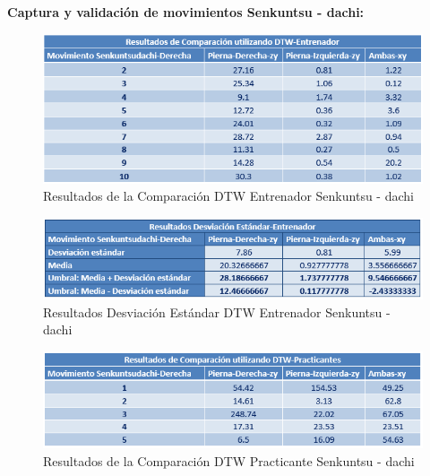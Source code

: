 \clearpage
\textbf{Captura y validación de movimientos Senkuntsu - dachi:}\\
\begin{figure}[H]%
	\begin{center}
		\includegraphics[scale=1]{./Figuras/Implementacion/Pruebas/Tablas/ResultadosDTW_Entrenador_Senkuntsudachi}
	\end{center}
	\caption{Resultados de la Comparación DTW Entrenador Senkuntsu - dachi}
	\label{fig:ResultadosDTW_Entrenador_Senkuntsudachi}
\end{figure}
\begin{figure}[H]%
	\begin{center}
		\includegraphics[scale=1]{./Figuras/Implementacion/Pruebas/Tablas/ResultadorDesvEstandar_Entrenador_Senkuntsudachi}
	\end{center}
	\caption{Resultados Desviación Estándar DTW Entrenador Senkuntsu - dachi}
	\label{fig:ResultadorDesvEstandar_Entrenador_Senkuntsudachi}
\end{figure}
\begin{figure}[H]%
	\begin{center}
		\includegraphics[scale=1]{./Figuras/Implementacion/Pruebas/Tablas/ResultadosDTW_Practicantes_Senkuntsudachi}
	\end{center}
	\caption{Resultados de la Comparación DTW Practicante Senkuntsu - dachi}
	\label{fig:ResultadosDTW_Practicantes_Senkuntsudachi}
\end{figure}
